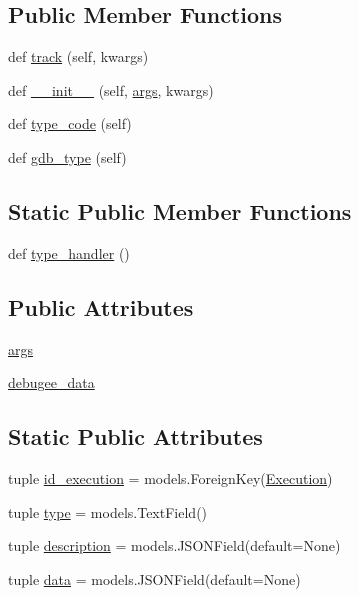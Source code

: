 \subsection*{Public Member Functions}
\begin{DoxyCompactItemize}
\item 
def \hyperlink{classmemoryoracle_1_1models_1_1Typed_aa1d5d8d5b7ebe5c2876f363e7eb669db}{track} (self, kwargs)
\item 
def \hyperlink{classmemoryoracle_1_1models_1_1Typed_a494dfbe205034b874ff9e8c7039f579b}{\+\_\+\+\_\+init\+\_\+\+\_\+} (self, \hyperlink{classmemoryoracle_1_1models_1_1Typed_a81616ab75a5a3b89f9707d0342033614}{args}, kwargs)
\item 
def \hyperlink{classmemoryoracle_1_1models_1_1Typed_ab5a609739cd10db2a18c381b59e33bc9}{type\+\_\+code} (self)
\item 
def \hyperlink{classmemoryoracle_1_1models_1_1Typed_ad32171ff59efbaa6cbc565cf672d4677}{gdb\+\_\+type} (self)
\end{DoxyCompactItemize}
\subsection*{Static Public Member Functions}
\begin{DoxyCompactItemize}
\item 
def \hyperlink{classmemoryoracle_1_1models_1_1Typed_a916b98ffd1bd7497c64446c8c3bb5aa5}{type\+\_\+handler} ()
\end{DoxyCompactItemize}
\subsection*{Public Attributes}
\begin{DoxyCompactItemize}
\item 
\hyperlink{classmemoryoracle_1_1models_1_1Typed_a81616ab75a5a3b89f9707d0342033614}{args}
\item 
\hyperlink{classmemoryoracle_1_1models_1_1Typed_a40d8be4b649e217afdf20f4856d10b30}{debugee\+\_\+data}
\end{DoxyCompactItemize}
\subsection*{Static Public Attributes}
\begin{DoxyCompactItemize}
\item 
tuple \hyperlink{classmemoryoracle_1_1models_1_1Typed_aeb96a1c604799fdc2062a0bc899af65f}{id\+\_\+execution} = models.\+Foreign\+Key(\hyperlink{classmemoryoracle_1_1models_1_1Execution}{Execution})
\item 
tuple \hyperlink{classmemoryoracle_1_1models_1_1Typed_af49ed49f278da3379e07f6260842a7ba}{type} = models.\+Text\+Field()
\item 
tuple \hyperlink{classmemoryoracle_1_1models_1_1Typed_a786391a15a2ed55cd5e3cbf5c042f34c}{description} = models.\+J\+S\+O\+N\+Field(default=None)
\item 
tuple \hyperlink{classmemoryoracle_1_1models_1_1Typed_ab61ec9770a4fbd9d29207b242b31c488}{data} = models.\+J\+S\+O\+N\+Field(default=None)
\end{DoxyCompactItemize}
